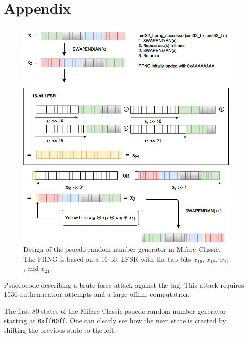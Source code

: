 \documentclass[10pt,twocolumn]{article}
\begin{document}
\section{Appendix}

\newpage
\begin{figure}[ht] %
\includegraphics[width=16cm]{prng-design.png}
\caption{Design of the psuedo-random number generator in Mifare Classic. The PRNG is based on a 16-bit LFSR with the tap bits $x_{16}$, $x_{18}$, $x_{19}$, and $x_{21}$.}
\label{fig:prng-design}
\end{figure}
\newpage

Psuedocode describing a brute-force attack against the tag. This attack requires 1536 authentication attempts and a large offline computation.
\newpage
\lstset{style=tiny}

The first 80 states of the Mifare Classic psuedo-random number generator starting at \verb!0xff00ff!. One can clearly see how the next state is created by shifting the previous state to the left.
\end{document}
